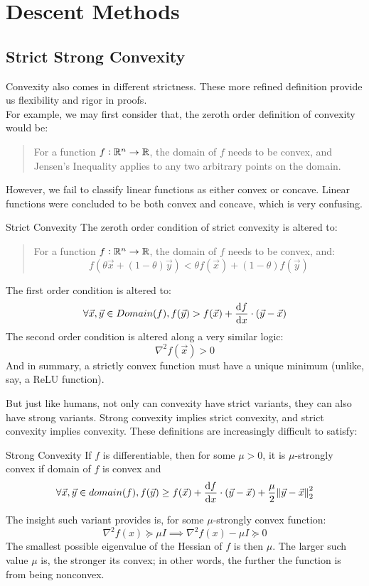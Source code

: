 \chapter{Descent Methods}

\section{Strict Strong Convexity}
Convexity also comes in different strictness. These more refined definition provide us flexibility and rigor in proofs. \\
For example, we may first consider that, the zeroth order definition of convexity would be:
\begin{quote}
    For a function $f: \R^n \rightarrow \R$, the domain of $f$ needs to be convex, and Jensen's Inequality applies to any two arbitrary points on the domain.
\end{quote}
However, we fail to classify linear functions as either convex or concave. Linear functions were concluded to be both convex and concave, which is very confusing.
\begin{ln-define}{Strict Convexity}{}
    The zeroth order condition of strict convexity is altered to:
    \begin{quote}
        For a function $f: \R^n \rightarrow \R$, the domain of $f$ needs to be convex, and:
        \[
            f(\theta \vec{x} + (1 - \theta) \vec{y}) < \theta f(\vec{x}) + (1 - \theta) f(\vec{y})
        \]
    \end{quote}
    The first order condition is altered to:
    \[
        \forall \vec{x}, \vec{y} \in Domain(f), f(\vec{y}) > f(\vec{x}) + \dv{f}{x} \cdot (\vec{y} - \vec{x})
    \]
    The second order condition is altered along a very similar logic:
    \[
        \nabla^2 f(\vec{x}) > 0
    \]
    And in summary, a strictly convex function must have a unique minimum (unlike, say, a ReLU function).
\end{ln-define}

But just like humans, not only can convexity have strict variants, they can also have strong variants.
Strong convexity implies strict convexity, and strict convexity implies convexity. These definitions are increasingly difficult to satisfy:
\begin{ln-define}{Strong Convexity}{}
    If $f$ is differentiable, then for some $\mu > 0$, it is $\mu$-strongly convex if domain of $f$ is convex and
    \[
        \forall \vec{x}, \vec{y} \in domain(f), f(\vec{y}) \geq f(\vec{x}) + \dv{f}{x} \cdot (\vec{y} - \vec{x}) + \frac{\mu}{2} \pnorm[2]{\vec{y} - \vec{x}}{2}
    \]
\end{ln-define}
The insight such variant provides is, for some $\mu$-strongly convex function:
\[
    \nabla^2 f(x) \succcurlyeq \mu I \implies \nabla^2 f(x) - \mu I \succcurlyeq 0
\]
The smallest possible eigenvalue of the Hessian of $f$ is then $\mu$.
The larger such value $\mu$ is, the stronger its convex; in other words, the further the function is from being nonconvex.

